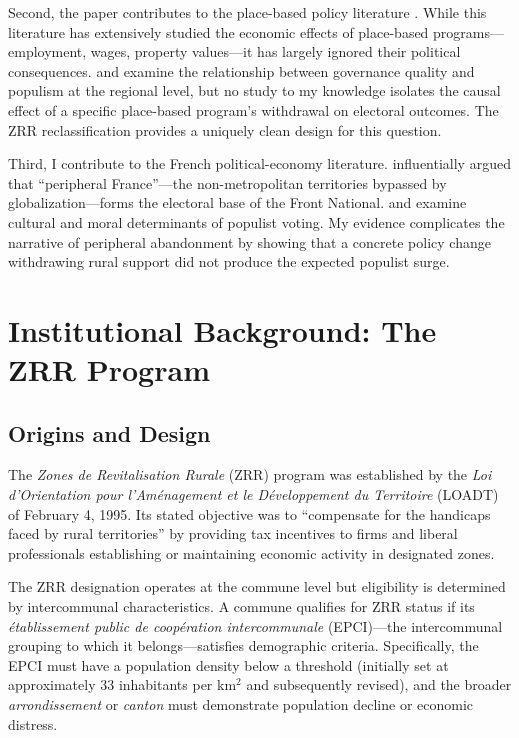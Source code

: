 \documentclass[12pt]{article}
\begin{document}
Second, the paper contributes to the place-based policy literature \citep{kline2014place, neumark2015place, busso2013assessing, criscuolo2019effects}. While this literature has extensively studied the economic effects of place-based programs---employment, wages, property values---it has largely ignored their political consequences. \citet{charron2023populism} and \citet{broz2021populism} examine the relationship between governance quality and populism at the regional level, but no study to my knowledge isolates the causal effect of a specific place-based program's withdrawal on electoral outcomes. The ZRR reclassification provides a uniquely clean design for this question.

Third, I contribute to the French political-economy literature. \citet{guilluy2014france} influentially argued that ``peripheral France''---the non-metropolitan territories bypassed by globalization---forms the electoral base of the Front National. \citet{becker2017shock} and \citet{enke2020moral} examine cultural and moral determinants of populist voting. My evidence complicates the narrative of peripheral abandonment by showing that a concrete policy change withdrawing rural support did not produce the expected populist surge.


\section{Institutional Background: The ZRR Program} \label{sec:background}

\subsection{Origins and Design}

The \textit{Zones de Revitalisation Rurale} (ZRR) program was established by the \textit{Loi d'Orientation pour l'Am\'{e}nagement et le D\'{e}veloppement du Territoire} (LOADT) of February 4, 1995. Its stated objective was to ``compensate for the handicaps faced by rural territories'' by providing tax incentives to firms and liberal professionals establishing or maintaining economic activity in designated zones.

The ZRR designation operates at the commune level but eligibility is determined by intercommunal characteristics. A commune qualifies for ZRR status if its \textit{\'{e}tablissement public de coop\'{e}ration intercommunale} (EPCI)---the intercommunal grouping to which it belongs---satisfies demographic criteria. Specifically, the EPCI must have a population density below a threshold (initially set at approximately 33 inhabitants per km$^2$ and subsequently revised), and the broader \textit{arrondissement} or \textit{canton} must demonstrate population decline or economic distress.
\end{document}
